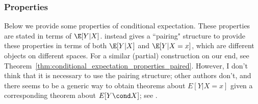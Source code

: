 \documentclass{article} %
\begin{document}
\subsubsection{Properties}

\begin{remark}
Below we provide some properties of conditional expectation.  These properties are stated in terms of $\E[Y|X]$. \citet[Sec.~5.5]{ash2000probability} instead gives a ``pairing" structure to provide these properties in terms of both $\E[Y|X]$ and  $\E[Y|X=x]$, which are different objects on different spaces.  For a similar (partial) construction on our end, see Theorem~\ref{thm:conditional_expectation_properties_paired}.  However, I don't think that it is necessary to use the pairing structure; other authors don't, and there seems to be a generic way to obtain theorems about $E[Y | X=x]$ given a corresponding theorem about $E[Y \cond X]$; see \cite[Sec.~5.5, Problem 3]{ash2000probability}.
\end{remark}
\end{document}

